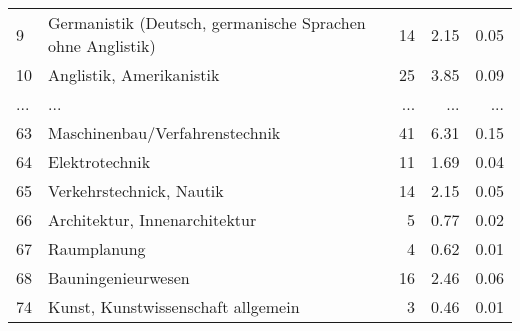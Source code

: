 \begin{longtable}{lXrrr}
        9 & \multicolumn{1}{X}{Germanistik (Deutsch, germanische Sprachen ohne Anglistik)} & %
          \num{14} &
          \num[round-mode=places,round-precision=2]{2,15} &
          \num[round-mode=places,round-precision=2]{0,05} \\
        10 & \multicolumn{1}{X}{Anglistik, Amerikanistik} & %
          \num{25} &
          \num[round-mode=places,round-precision=2]{3,85} &
          \num[round-mode=places,round-precision=2]{0,09} \\
       ... & ... & ... & ... & ... \\
        63 & \multicolumn{1}{X}{Maschinenbau/Verfahrenstechnik} & %
          \num{41} &
          \num[round-mode=places,round-precision=2]{6,31} &
          \num[round-mode=places,round-precision=2]{0,15} \\

        64 & \multicolumn{1}{X}{Elektrotechnik} & %
          \num{11} &
          \num[round-mode=places,round-precision=2]{1,69} &
          \num[round-mode=places,round-precision=2]{0,04} \\

        65 & \multicolumn{1}{X}{Verkehrstechnick, Nautik} & %
          \num{14} &
          \num[round-mode=places,round-precision=2]{2,15} &
          \num[round-mode=places,round-precision=2]{0,05} \\

        66 & \multicolumn{1}{X}{Architektur, Innenarchitektur} & %
          \num{5} &
          \num[round-mode=places,round-precision=2]{0,77} &
          \num[round-mode=places,round-precision=2]{0,02} \\

        67 & \multicolumn{1}{X}{Raumplanung} & %
          \num{4} &
          \num[round-mode=places,round-precision=2]{0,62} &
          \num[round-mode=places,round-precision=2]{0,01} \\

        68 & \multicolumn{1}{X}{Bauningenieurwesen} & %
          \num{16} &
          \num[round-mode=places,round-precision=2]{2,46} &
          \num[round-mode=places,round-precision=2]{0,06} \\

        74 & \multicolumn{1}{X}{Kunst, Kunstwissenschaft allgemein} & %
          \num{3} &
          \num[round-mode=places,round-precision=2]{0,46} &
          \num[round-mode=places,round-precision=2]{0,01} \\


\end{longtable}
